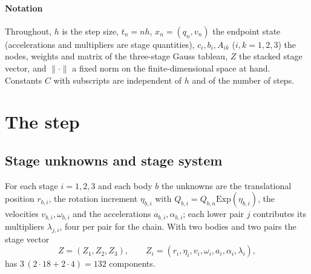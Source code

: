 \paragraph{Notation}
Throughout, $h$ is the step size, $t_n=nh$, $x_n=(q_n,v_n)$ the endpoint state (accelerations and
multipliers are stage quantities), $c_i,b_i,A_{ik}$ ($i,k=1,2,3$) the nodes, weights and matrix of
the three-stage Gauss tableau, $Z$ the stacked stage vector, and $\|\cdot\|$ a fixed norm on the
finite-dimensional space at hand. Constants $C$ with subscripts are independent of $h$ and of the
number of steps.

\section{The \method{} step}
\label{sec:method}

\subsection{Stage unknowns and stage system}

For each stage $i=1,2,3$ and each body $b$ the unknowns are the translational position $r_{b,i}$,
the rotation increment $\eta_{b,i}$ with $Q_{b,i}=Q_{b,n}\mathrm{Exp}(\eta_{b,i})$, the velocities
$v_{b,i},\omega_{b,i}$ and the accelerations $a_{b,i},\alpha_{b,i}$; each lower pair $j$
contributes its multipliers $\lambda_{j,i}$, four per pair for the chain. With two bodies and two
pairs the stage vector
\begin{equation}
  Z=(Z_1,Z_2,Z_3),\qquad Z_i=(r_i,\eta_i,v_i,\omega_i,a_i,\alpha_i,\lambda_i),
  \label{eq:stage-variable-block}
\end{equation}
has $3\,(2\cdot18+2\cdot4)=132$ components.

